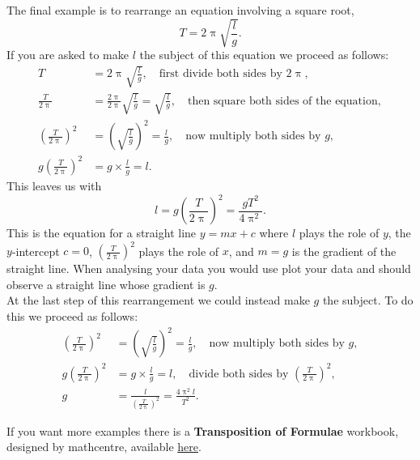 \begin{ex}
The final example is to rearrange an equation involving a square root,
\begin{equation*}
T=2\uppi\sqrt{\frac{l}{g}}.
\end{equation*}
If you are asked to make $l$ the subject of this equation we proceed as follows:
\begin{align*}
T&=2\uppi\sqrt{\frac{l}{g}}, \quad \text{first divide both sides by $2\uppi$},\\
\frac{T}{2\uppi}&=\frac{2\uppi}{2\uppi}\sqrt{\frac{l}{g}}=\sqrt{\frac{l}{g}}, \quad \text{then square both sides of the equation},\\
\left(\frac{T}{2\uppi}\right)^{2}&=\left(\sqrt{\frac{l}{g}}\right)^{2}=\frac{l}{g}, \quad \text{now multiply both sides by $g$},\\
g\left(\frac{T}{2\uppi}\right)^{2}&=g\times\frac{l}{g}=l.
\end{align*}
This leaves us with
\begin{equation*}
l=g\left(\frac{T}{2\uppi}\right)^{2}=\frac{gT^{2}}{4\uppi^{2}}.
\end{equation*}
This is the equation for a straight line $y=mx+c$ where $l$ plays the role of $y$, the $y$-intercept $c=0$, $\left(\frac{T}{2\uppi}\right)^{2}$ plays the role of $x$, and $m=g$ is the gradient of the straight line. When analysing your data you would use plot your data and should observe a straight line whose gradient is $g$.\\

At the last step of this rearrangement we could instead make $g$ the subject. To do this we proceed as follows:
\begin{align*}
\left(\frac{T}{2\uppi}\right)^{2}&=\left(\sqrt{\frac{l}{g}}\right)^{2}=\frac{l}{g}, \quad \text{now multiply both sides by $g$},\\
g\left(\frac{T}{2\uppi}\right)^{2}&=g\times \frac{l}{g}=l, \quad \text{divide both sides by }\left(\frac{T}{2\uppi}\right)^{2}, \\
g&=\frac{l}{\left(\frac{T}{2\uppi}\right)^{2}}=\frac{4\uppi^{2} l}{T^{2}}.
\end{align*}
\end{ex}

If you want more examples there is a \textbf{Transposition of Formulae} workbook, designed by mathcentre,  available \href{https://www.mathcentre.ac.uk/resources/uploaded/mc-ty-transposition-2009-1.pdf}{here}.

